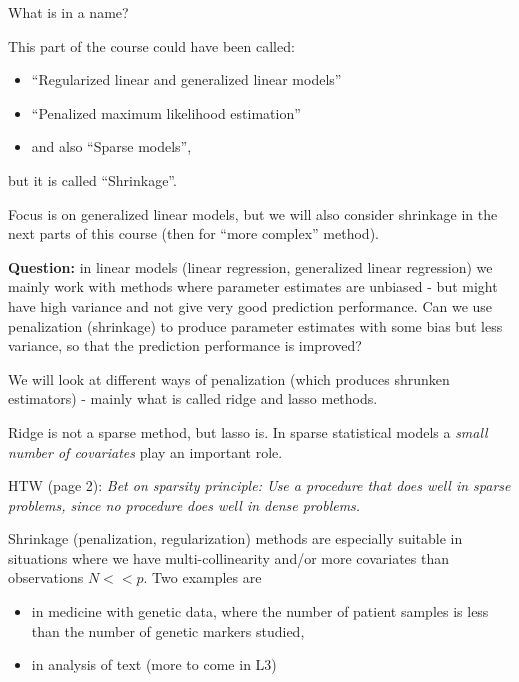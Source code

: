 \documentclass[
  ignorenonframetext,
]{beamer}
\providecommand{\tightlist}{%
  \setlength{\itemsep}{0pt}\setlength{\parskip}{0pt}}
\begin{document}
\begin{frame}

\begin{block}{What is in a name?}

This part of the course could have been called:

\begin{itemize}
\tightlist
\item
  ``Regularized linear and generalized linear models''
\item
  ``Penalized maximum likelihood estimation''
\item
  and also ``Sparse models'',
\end{itemize}

but it is called ``Shrinkage''.

Focus is on generalized linear models, but we will also consider
shrinkage in the next parts of this course (then for ``more complex''
method).

\textbf{Question:} in linear models (linear regression, generalized
linear regression) we mainly work with methods where parameter estimates
are unbiased - but might have high variance and not give very good
prediction performance. Can we use penalization (shrinkage) to produce
parameter estimates with some bias but less variance, so that the
prediction performance is improved?

\end{block}

\end{frame}

\begin{frame}

We will look at different ways of penalization (which produces shrunken
estimators) - mainly what is called ridge and lasso methods.

Ridge is not a sparse method, but lasso is. In sparse statistical models
a \emph{small number of covariates} play an important role.

HTW (page 2): \emph{Bet on sparsity principle: Use a procedure that does
well in sparse problems, since no procedure does well in dense
problems.}

Shrinkage (penalization, regularization) methods are especially suitable
in situations where we have multi-collinearity and/or more covariates
than observations \(N<<p\). Two examples are

\begin{itemize}
\tightlist
\item
  in medicine with genetic data, where the number of patient samples is
  less than the number of genetic markers studied,
\item
  in analysis of text (more to come in L3)
\end{itemize}

\end{frame}
\end{document}
